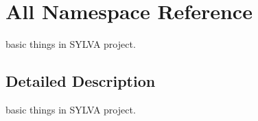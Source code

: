 \hypertarget{namespace_all}{}\section{All Namespace Reference}
\label{namespace_all}


basic things in S\+Y\+L\+VA project.  




\subsection{Detailed Description}
basic things in S\+Y\+L\+VA project. 


